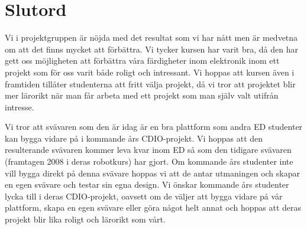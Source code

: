 \section{Slutord}
Vi i projektgruppen är nöjda med det resultat som vi har nått men är medvetna om
att det finns mycket att förbättra. Vi tycker kursen har varit bra, då den har
gett oss möjligheten att förbättra våra färdigheter inom elektronik inom ett
projekt som för oss varit både roligt och intressant. Vi hoppas att kursen även
i framtiden tillåter studenterna att fritt välja projekt, då vi tror att
projektet blir mer lärorikt när man får arbeta med ett projekt som man själv
valt utifrån intresse.

Vi tror att svävaren som den är idag är en bra plattform som andra ED studenter
kan bygga vidare på i kommande års CDIO-projekt. Vi hoppas att den resulterande
svävaren kommer leva kvar inom ED så som den tidigare svävaren (framtagen 2008 i
deras robotkurs) har gjort. Om kommande års studenter inte vill bygga direkt på
denna svävare hoppas vi att de antar utmaningen och skapar en egen svävare och
testar sin egna design. Vi önskar kommande års studenter lycka till i deras
CDIO-projekt, oavsett om de väljer att bygga vidare på vår plattform, skapa en
egen svävare eller göra något helt annat och hoppas att deras projekt blir lika
roligt och lärorikt som vårt.
